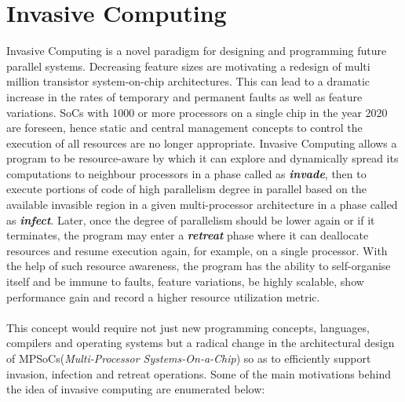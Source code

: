 \chapter{Invasive Computing}
\label{chapter:invasive computing}
Invasive Computing is a novel paradigm for designing and programming future parallel systems. Decreasing feature sizes are motivating a redesign of multi million transistor system-on-chip architectures. This can lead to a dramatic increase in the rates of temporary and permanent faults as well as feature variations. SoCs with 1000 or more processors on a single chip in the year 2020 are foreseen, hence static and central management concepts to control the execution of all resources are no longer appropriate. Invasive Computing allows a program to be resource-aware by which it can explore and dynamically spread its computations to neighbour processors in a phase called as \textbf{\textit{invade}}, then to execute portions of code of high parallelism degree in parallel based on the available invasible region in a given multi-processor architecture in a phase called as \textbf{\textit{infect}}. Later, once the degree of parallelism should be lower again or if it terminates, the program may enter a \textbf{\textit{retreat}} phase where it can deallocate resources and resume execution again, for example, on a single processor. With the help of such resource awareness, the program has the ability to self-organise itself and be immune to faults, feature variations, be highly scalable, show performance gain and record a higher resource utilization metric.\\ \\
This concept would require not just new programming concepts, languages, compilers and operating systems but a radical change in the architectural design of MPSoCs(\textit{Multi-Processor Systems-On-a-Chip}) so as to efficiently support invasion, infection and retreat operations. Some of the main motivations behind the idea of invasive computing are enumerated below:
